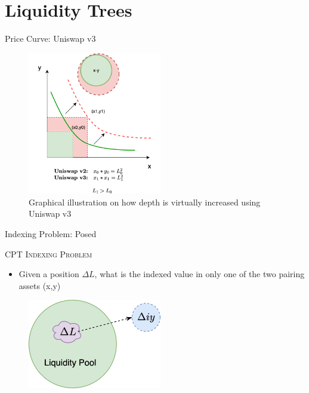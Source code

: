 \documentclass[10pt,xcolor=svgnames]{beamer} %
\begin{document}
\section{Liquidity Trees}


\begin{frame}{Price Curve: Uniswap v3} 

\begin{figure}[h!]
\includegraphics[width=2.3in]{img/uniswap_v3.png}
\caption{Graphical illustration on how depth is virtually increased using Uniswap v3} 
\label{fig:uniswap_v3}
\end{figure}

\end{frame}

\begin{frame}{Indexing Problem: Posed} 

\begin{exampleblock}{\textsc{CPT Indexing Problem}}
\begin{itemize}
  \item Given a position $\Delta L$, what is the indexed value in only one of the two pairing assets (x,y)
\end{itemize}
\end{exampleblock}

\begin{figure}[h!]
\includegraphics[width=2.3in]{img/indexed_tkn_lrg.png}
\label{fig:uniswap_v3}
\end{figure}

\end{frame}
\end{document}
